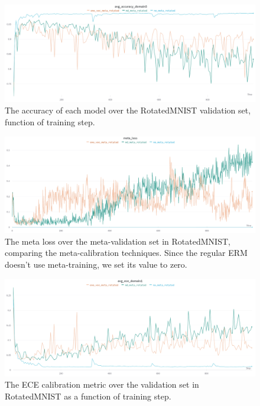 \documentclass[12pt,a4paper]{article}
\begin{document}
		\begin{figure}[h]
			\centering
			\includegraphics[width=1\linewidth]{images/results/avg_acc_val}
			\caption{The accuracy of each model over the RotatedMNIST validation set, function of training step.}
			\label{fig:rotated_avg_acc}
		\end{figure}
		\begin{figure}[h]
			\centering
			\includegraphics[width=1\linewidth]{images/results/meta_loss}
			\caption{The meta loss over the meta-validation set in RotatedMNIST, comparing the meta-calibration techniques. Since the regular ERM doesn't use meta-training, we set its value to zero.}
			\label{fig:rotated_meta_loss}
		\end{figure}
		\begin{figure}[h]
			\centering
			\includegraphics[width=1\linewidth]{images/results/avg_ece_val}
			\caption{The ECE calibration metric over the validation set in RotatedMNIST as a function of training step.}
			\label{fig:rotated_ece}
		\end{figure}
	
\end{document}
